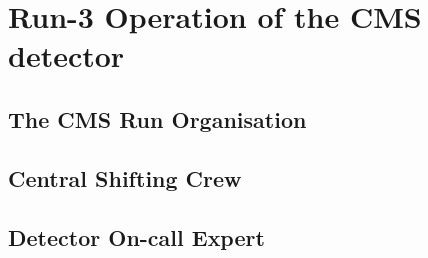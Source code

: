 \chapter{Run-3 Operation of the CMS detector}

\section{The CMS Run Organisation}

\section{Central Shifting Crew}

\section{Detector On-call Expert}